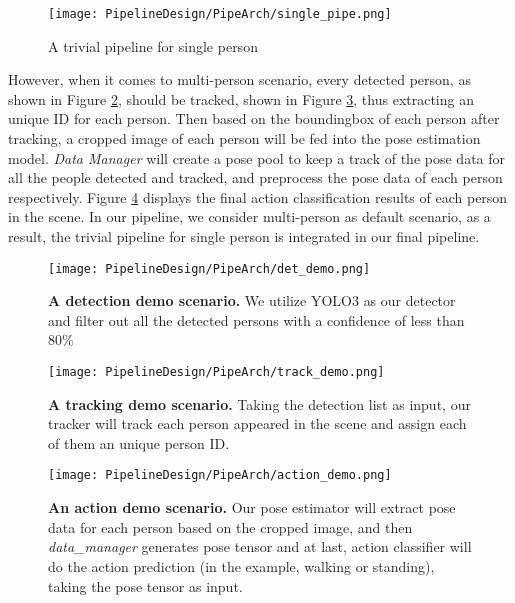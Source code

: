 \begin{figure}[H]
  \centering
  \texttt{[image: PipelineDesign/PipeArch/single\_pipe.png]}
  \caption{A trivial pipeline for single person}
  \label{fig:single_pipe}
\end{figure}

However, when it comes to multi-person scenario, every detected person, as shown in Figure \ref{fig:det_demo}, should be tracked, shown in Figure \ref{fig:track_demo}, thus extracting an unique ID for each person. Then based on the boundingbox of each person after tracking, a cropped image of each person will be fed into the pose estimation model. \textit{Data Manager} will create a pose pool to keep a track of the pose data for all the people detected and tracked, and preprocess the pose data of each person respectively. Figure \ref{fig:action_demo} displays the final action classification results of each person in the scene. In our pipeline, we consider multi-person as default scenario, as a result, the trivial pipeline for single person is integrated in our final pipeline.  

\begin{figure}[h!]
  \centering
  \texttt{[image: PipelineDesign/PipeArch/det\_demo.png]}
  \caption{\textbf{A detection demo scenario.} We utilize YOLO3 \cite{yolov3} as our detector and  
           filter out all the detected persons with a confidence of less than 80\%}
  \label{fig:det_demo}
\end{figure}

\begin{figure}[h!]
  \centering
  \texttt{[image: PipelineDesign/PipeArch/track\_demo.png]}
  \caption{\textbf{A tracking demo scenario.} Taking the detection list as input, our tracker will
           track each person appeared in the scene and assign each of them an unique person ID.}
  \label{fig:track_demo}
\end{figure}

\begin{figure}[h!]
  \centering
  \texttt{[image: PipelineDesign/PipeArch/action\_demo.png]}
  \caption{\textbf{An action demo scenario.} Our pose estimator will extract pose data for each person
           based on the cropped image, and then \textit{data\_manager} generates pose tensor and at 
           last, action classifier will do the action prediction (in the example, walking or standing),
           taking the pose tensor as input.}
  \label{fig:action_demo}
\end{figure}

